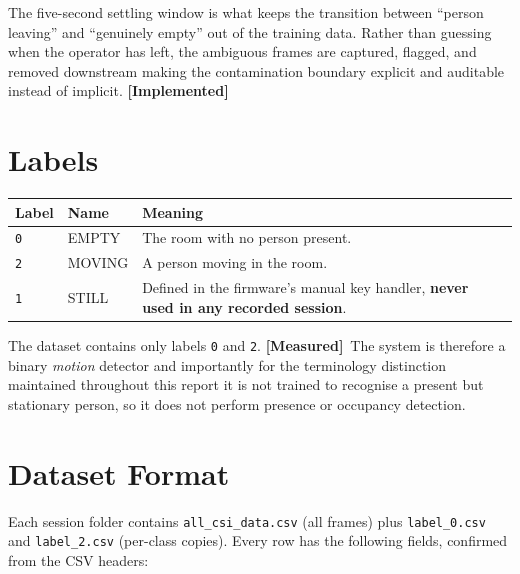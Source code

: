 \documentclass[11pt,a4paper,oneside]{report}
\newcommand{\evidencetag}[2]{{\small\sffamily\bfseries\textcolor{#1}{[#2]}}}
\newcommand{\Impl}{\evidencetag{good}{Implemented}}
\newcommand{\Meas}{\evidencetag{accent}{Measured}}
\newcommand{\code}[1]{\texttt{\small #1}}
\begin{document}
\noindent
The five-second settling window is what keeps the transition between ``person
leaving'' and ``genuinely empty'' out of the training data. Rather than
guessing when the operator has left, the ambiguous frames are captured,
flagged, and removed downstream making the contamination boundary explicit
and auditable instead of implicit. \Impl

\section{Labels}

\begin{center}
\renewcommand{\arraystretch}{1.25}
\begin{tabularx}{0.9\linewidth}{|l|l|X|}
\hline
\textbf{Label} & \textbf{Name} & \textbf{Meaning} \\
\hline
\code{0} & EMPTY  & The room with no person present. \\
\hline
\code{2} & MOVING & A person moving in the room. \\
\hline
\code{1} & STILL  & Defined in the firmware's manual key handler,
                    \textbf{never used in any recorded session}. \\
\hline
\end{tabularx}
\end{center}

\noindent
The dataset contains only labels \code{0} and \code{2}. \Meas\ The system is
therefore a binary \emph{motion} detector and importantly for the
terminology distinction maintained throughout this report it is not trained
to recognise a present but stationary person, so it does not perform presence
or occupancy detection.

\section{Dataset Format}

Each session folder contains \code{all\_csi\_data.csv} (all frames) plus
\code{label\_0.csv} and \code{label\_2.csv} (per-class copies). Every row has
the following fields, confirmed from the CSV headers:
\end{document}
